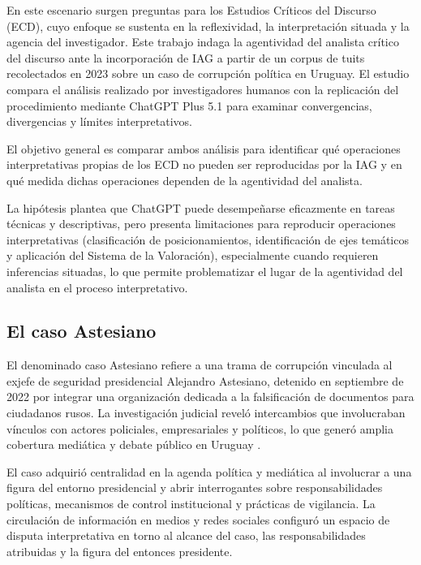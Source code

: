 \documentclass[spanish]{textolivre}
\begin{document}
En este escenario surgen preguntas para los Estudios Críticos del Discurso (ECD), cuyo enfoque se sustenta en la reflexividad, la interpretación situada y la agencia del investigador. Este trabajo indaga la agentividad del analista crítico del discurso ante la incorporación de IAG a partir de un corpus de tuits recolectados en 2023 sobre un caso de corrupción política en Uruguay. El estudio compara el análisis realizado por investigadores humanos con la replicación del procedimiento mediante ChatGPT Plus 5.1 para examinar convergencias, divergencias y límites interpretativos.

El objetivo general es comparar ambos análisis para identificar qué operaciones interpretativas propias de los ECD no pueden ser reproducidas por la IAG y en qué medida dichas operaciones dependen de la agentividad del analista.

La hipótesis plantea que ChatGPT puede desempeñarse eficazmente en tareas técnicas y descriptivas, pero presenta limitaciones para reproducir operaciones interpretativas (clasificación de posicionamientos, identificación de ejes temáticos y aplicación del Sistema de la Valoración), especialmente cuando requieren inferencias situadas, lo que permite problematizar el lugar de la agentividad del analista en el proceso interpretativo.

\subsection{El caso Astesiano}\label{sec-normas}
El denominado caso Astesiano refiere a una trama de corrupción vinculada al exjefe de seguridad presidencial Alejandro Astesiano, detenido en septiembre de 2022 por integrar una organización dedicada a la falsificación de documentos para ciudadanos rusos. La investigación judicial reveló intercambios que involucraban vínculos con actores policiales, empresariales y políticos, lo que generó amplia cobertura mediática y debate público en Uruguay \cite{ladiaria2021custodia,ladiaria2022pasaportes,mvdnoticias2022chat}.

El caso adquirió centralidad en la agenda política y mediática al involucrar a una figura del entorno presidencial y abrir interrogantes sobre responsabilidades políticas, mecanismos de control institucional y prácticas de vigilancia. La circulación de información en medios y redes sociales configuró un espacio de disputa interpretativa en torno al alcance del caso, las responsabilidades atribuidas y la figura del entonces presidente.
\end{document}
